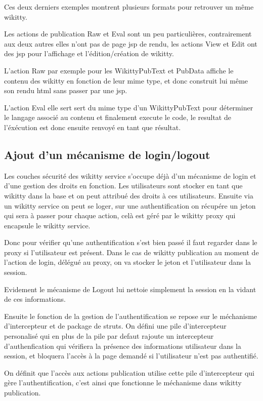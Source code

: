 Ces deux derniers exemples montrent plusieurs formats pour retrouver un même
wikitty. 

Les actions de publication Raw et Eval sont un peu particulières, contrairement
aux deux autres elles n'ont pas de page jsp de rendu, les actions View et Edit
ont des jsp pour l'affichage et l'édition/création de wikitty.

L'action Raw par exemple pour les WikittyPubText et PubData affiche le contenu
des wikitty en fonction de leur mime type, et donc construit lui même son rendu
html sans passer par une jsp.

L'action Eval elle sert sert du mime type d'un WikittyPubText pour déterminer le
langage associé au contenu et finalement execute le code, le resultat de
l'éxécution est donc ensuite renvoyé en tant que résultat.

\subsection{Ajout d'un mécanisme de login/logout}

Les couches sécurité des wikitty service s'occupe déjà d'un mécanisme de login
et d'une gestion des droits en fonction. Les utilisateurs sont stocker en tant
que wikitty dans la base et on peut attribué des droits à ces utilisateurs.
Ensuite via un wikitty service on peut se loger, sur une authentification on
récupére un jeton qui sera à passer pour chaque action, celà est géré par le
wikitty proxy qui encapsule le wikitty service.

Donc pour vérifier qu'une authentification s'est bien passé il faut regarder
dans le proxy si l'utilisateur est présent. Dans le cas de wikitty publication
au moment de l'action de login, délégué au proxy, on va stocker le jeton et
l'utilisateur dans la session.

Evidement le mécanisme de Logout lui nettoie simplement la session en la vidant
de ces informations.

Ensuite le fonction de la gestion de l'authentification se repose sur le
méchanisme d'intercepteur et de package de struts. On défini une pile
d'intercepteur personalisé qui en plus de la pile par defaut rajoute un
intercepteur d'authenfication qui vérifiera la présence des informations
utilisateur dans la session, et bloquera l'accès à la page demandé si
l'utilisateur n'est pas authentifié.

On définit que l'accès aux actions publication utilise cette pile d'intercepteur
qui gère l'authentification, c'est ainsi que fonctionne le méchanisme dans
wikitty publication.

